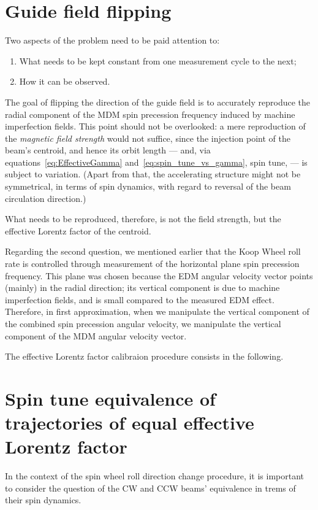 

\section{Guide field flipping}\label{chpt3:GFF}

Two aspects of the problem need to be paid attention to:
\begin{enumerate}
\item What needs to be kept constant from one measurement cycle to the next;
\item How it can be observed.
\end{enumerate}

The goal of flipping the direction of the guide field is to accurately reproduce the radial component
of the MDM spin precession frequency induced by machine imperfection fields. This point should not be overlooked:
a mere reproduction of the \emph{magnetic field strength} would not suffice, since the injection point of
the beam's centroid,
and hence its orbit length --- and, via equations~\eqref{eq:EffectiveGamma} and~\eqref{eq:spin_tune_vs_gamma},
spin tune, --- is subject to variation. (Apart from that, the accelerating structure might not be symmetrical,
in terms of spin dynamics, with regard to reversal of the beam circulation direction.)

What needs to be reproduced, therefore, is not the field strength, but the effective Lorentz factor of
the centroid.

Regarding the second question, we mentioned earlier that the Koop Wheel roll rate
is controlled through measurement of the horizontal plane spin precession frequency. 
This plane was chosen because the EDM angular velocity vector points
(mainly) in the radial direction; its vertical component is due to machine imperfection fields,
and is small compared to
the measured EDM effect. Therefore, in first approximation, when we manipulate the vertical component of the 
combined spin precession angular velocity, we manipulate the vertical component of the MDM
angular velocity vector.

The effective Lorentz factor calibraion procedure consists in the following.



\section{Spin tune equivalence of trajectories of equal effective Lorentz factor}\label{sec:spin_tune_traj_equivalence}
In the context of the spin wheel roll direction change procedure, it is important to consider the question
of the CW and CCW beams' equivalence in trems of their spin dynamics.

